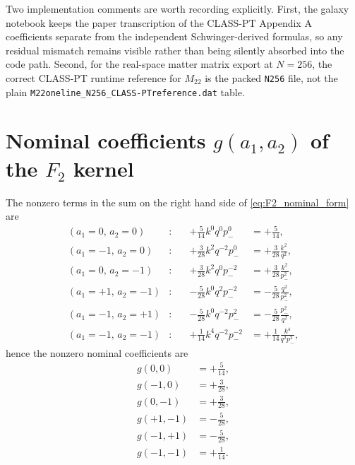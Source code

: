 \documentclass[a4paper,11pt]{article}
\newcommand{\codefont}[1]{{\texttt{#1}}}
\newcommand{\<}{\langle}
\renewcommand{\>}{\rangle}
\begin{document}
Two implementation comments are worth recording explicitly. First, the galaxy notebook keeps the paper transcription of the CLASS-PT Appendix A coefficients separate from the independent Schwinger-derived formulas, so any residual mismatch remains visible rather than being silently absorbed into the code path. Second, for the real-space matter matrix export at \(N=256\), the correct CLASS-PT runtime reference for \(M_{22}\) is the packed \codefont{N256} file, not the plain \codefont{M22oneline\_N256\_CLASS-PTreference.dat} table.

\section{Nominal coefficients \(g(a_1,a_2)\) of the \(F_2\) kernel}
\label{app:g_a1a2}

The nonzero terms in the sum on the right hand side of \cref{eq:F2_nominal_form} are
\[
\begin{alignedat}{2}
(a_1=0,\,a_2=0)    &:\quad & +\frac{5}{14}k^0q^0p_-^0      &= +\frac{5}{14}, \\
(a_1=-1,\,a_2=0)   &:\quad & +\frac{3}{28}k^2q^{-2}p_-^0   &= +\frac{3}{28}\frac{k^2}{q^2}, \\
(a_1=0,\,a_2=-1)   &:\quad & +\frac{3}{28}k^2q^0p_-^{-2}   &= +\frac{3}{28}\frac{k^2}{p_-^2}, \\
(a_1=+1,\,a_2=-1)  &:\quad & -\frac{5}{28}k^0q^2p_-^{-2}   &= -\frac{5}{28}\frac{q^2}{p_-^2}, \\
(a_1=-1,\,a_2=+1)  &:\quad & -\frac{5}{28}k^0q^{-2}p_-^2   &= -\frac{5}{28}\frac{p_-^2}{q^2}, \\
(a_1=-1,\,a_2=-1)  &:\quad & +\frac{1}{14}k^4q^{-2}p_-^{-2} &= +\frac{1}{14}\frac{k^4}{q^2 p_-^2},
\end{alignedat}
\]
hence the nonzero nominal coefficients are
\begin{align}
    g(0,0)&=+\frac{5}{14},\\
    g(-1,0)&=+\frac{3}{28},\\
    g(0,-1)&=+\frac{3}{28},\\
    g(+1,-1)&=-\frac{5}{28},\\
    g(-1,+1)&=-\frac{5}{28},\\
    g(-1,-1)&=+\frac{1}{14}.
\end{align}

\clearpage


\end{document}
